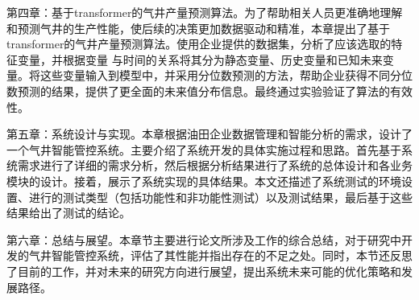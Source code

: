 第四章：基于transformer的气井产量预测算法。为了帮助相关人员更准确地理解和预测气井的生产性能，使后续的决策更加数据驱动和精准，本章提出了基于transformer的气井产量预测算法。使用企业提供的数据集，分析了应该选取的特征变量，并根据变量
与时间的关系将其分为静态变量、历史变量和已知未来变量。将这些变量输入到模型中，并采用分位数预测的方法，帮助企业获得不同分位数预测的结果，提供了更全面的未来值分布信息。最终通过实验验证了算法的有效性。

第五章：系统设计与实现。本章根据油田企业数据管理和智能分析的需求，设计了一个气井智能管控系统。主要介绍了系统开发的具体实施过程和思路。首先基于系统需求进行了详细的需求分析，然后根据分析结果进行了系统的总体设计和各业务模块的设计。接着，展示了系统实现的具体结果。本文还描述了系统测试的环境设置、进行的测试类型（包括功能性和非功能性测试）以及测试结果，最后基于这些结果给出了测试的结论。

第六章：总结与展望。本章节主要进行论文所涉及工作的综合总结，对于研究中开发的气井智能管控系统，评估了其性能并指出存在的不足之处。同时，本节还反思了目前的工作，并对未来的研究方向进行展望，提出系统未来可能的优化策略和发展路径。